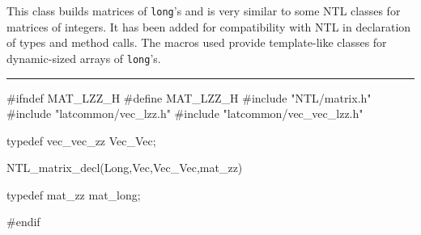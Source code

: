 % 
% 
% 
% 



This class builds matrices of \texttt{long}'s and is very similar to some NTL
classes for matrices of integers. It has been added for compatibility with NTL in 
declaration of types and method calls. The macros used provide template-like
classes for dynamic-sized arrays of \texttt{long}'s.



\bigskip\hrule
\code \hide
#ifndef MAT_LZZ_H
#define MAT_LZZ_H
\endhide
#include "NTL/matrix.h"
#include "latcommon/vec_lzz.h"
#include "latcommon/vec_vec_lzz.h"


typedef vec_vec_zz Vec_Vec; 

NTL_matrix_decl(Long,Vec,Vec_Vec,mat_zz)

typedef mat_zz mat_long; 

\hide
#endif
\endhide
\endcode
